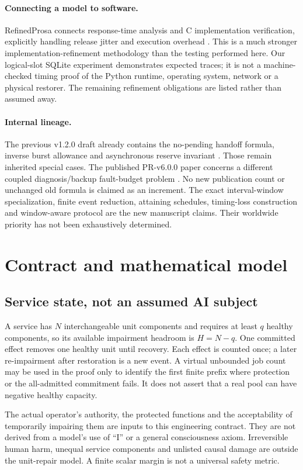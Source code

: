 \documentclass[11pt,a4paper]{article}
\theoremstyle{definition}\newtheorem{definition}{Definition}
\begin{document}
\paragraph{Connecting a model to software.}
RefinedProsa connects response-time analysis and C implementation verification, explicitly handling release jitter and execution overhead \cite{refinedprosa}. This is a much stronger implementation-refinement methodology than the testing performed here. Our logical-slot SQLite experiment demonstrates expected traces; it is not a machine-checked timing proof of the Python runtime, operating system, network or a physical restorer. The remaining refinement obligations are listed rather than assumed away.

\paragraph{Internal lineage.}
The previous v1.2.0 draft already contains the no-pending handoff formula, inverse burst allowance and asynchronous reserve invariant \cite{previous}. Those remain inherited special cases. The published PR-v6.0.0 paper concerns a different coupled diagnosis/backup fault-budget problem \cite{pr6}. No new publication count or unchanged old formula is claimed as an increment. The exact interval-window specialization, finite event reduction, attaining schedules, timing-loss construction and window-aware protocol are the new manuscript claims. Their worldwide priority has not been exhaustively determined.

\section{Contract and mathematical model}
\label{sec:model}
\subsection{Service state, not an assumed AI subject}
A service has $N$ interchangeable unit components and requires at least $q$ healthy components, so its available impairment headroom is $H=N-q$. One committed effect removes one healthy unit until recovery. Each effect is counted once; a later re-impairment after restoration is a new event. A virtual unbounded job count may be used in the proof only to identify the first finite prefix where protection or the all-admitted commitment fails. It does not assert that a real pool can have negative healthy capacity.

The actual operator's authority, the protected functions and the acceptability of temporarily impairing them are inputs to this engineering contract. They are not derived from a model's use of ``I'' or a general consciousness axiom. Irreversible human harm, unequal service components and unlisted causal damage are outside the unit-repair model. A finite scalar margin is not a universal safety metric.
\end{document}
